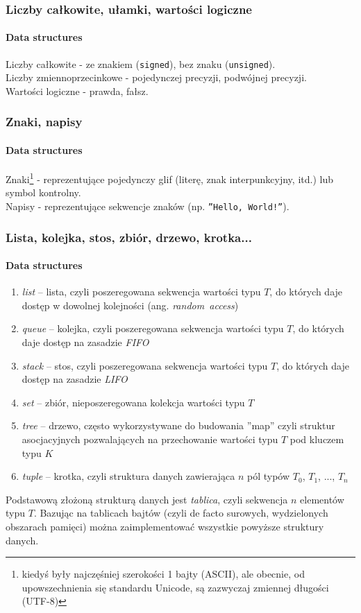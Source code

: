 \documentclass[aspectratio=169]{beamer}
\begin{document}
\begin{frame}
    \frametitle{Liczby całkowite, ułamki, wartości logiczne}
    \framesubtitle{Data structures}

    Liczby całkowite - ze znakiem ({\tt signed}), bez znaku ({\tt unsigned}).\\
    Liczby zmiennoprzecinkowe - pojedynczej precyzji, podwójnej precyzji.\\
    Wartości logiczne - prawda, fałsz.
\end{frame}

\begin{frame}
    \frametitle{Znaki, napisy}
    \framesubtitle{Data structures}

    Znaki\footnote{kiedyś były najczęśniej szerokości 1 bajty (ASCII), ale
    obecnie, od upowszechnienia się standardu Unicode, są zazwyczaj zmiennej
    długości (UTF-8)} - reprezentujące pojedynczy glif (literę, znak
    interpunkcyjny, itd.) lub symbol kontrolny.\\
    Napisy - reprezentujące sekwencje znaków (np. {\tt ''Hello, World!''}).
\end{frame}

\begin{frame}
    \frametitle{Lista, kolejka, stos, zbiór, drzewo, krotka...}
    \framesubtitle{Data structures}

    {\scriptsize
    \begin{enumerate}
        \item \emph{list} -- lista, czyli poszeregowana sekwencja wartości typu
            $T$, do których daje dostęp w dowolnej kolejności (ang.
            \emph{random~access})
        \item \emph{queue} -- kolejka, czyli poszeregowana sekwencja wartości
            typu $T$, do których daje dostęp na zasadzie \emph{FIFO}
        \item \emph{stack} -- stos, czyli poszeregowana sekwencja wartości
            typu $T$, do których daje dostęp na zasadzie \emph{LIFO}
        \item \emph{set} -- zbiór, nieposzeregowana kolekcja wartości typu $T$
        \item \emph{tree} -- drzewo, często wykorzystywane do budowania
            ''map'' czyli struktur asocjacyjnych pozwalających na przechowanie
            wartości typu $T$ pod kluczem typu $K$
        \item \emph{tuple} -- krotka, czyli struktura danych zawierająca $n$ pól
            typów $T_0$, $T_1$, ..., $T_n$
    \end{enumerate}}

    Podstawową złożoną strukturą danych jest \emph{tablica}, czyli sekwencja $n$
    elementów typu $T$. Bazując na tablicach bajtów (czyli de facto surowych,
    wydzielonych obszarach pamięci) można zaimplementować wszystkie powyższe
    struktury danych.
\end{frame}
\end{document}
